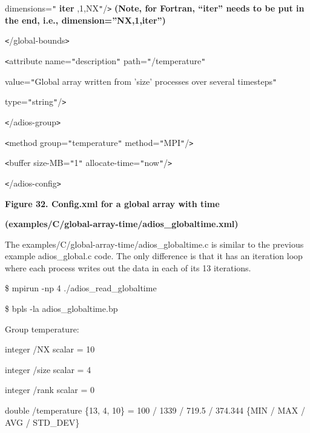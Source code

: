 {\color{color02} dimensions=\texttt{"}}{\color{color02} \textbf{iter}}{\color{color02} ,1,NX\texttt{"}/\texttt{>} 
   }{\color{color02} \textbf{(Note, for Fortran, ``iter'' needs to be put in the 
end, i.e., dimension=''NX,1,iter'')}}

\parindent=14pt
{\color{color02} \texttt{<}/global-bounds\texttt{>}}

\parindent=28pt
\texttt{<}attribute name=\texttt{"}description\texttt{"} path=\texttt{"}/temperature\texttt{"} 

\parindent=43pt
value=\texttt{"}Global array written from 'size' processes over several timesteps\texttt{"} 

type=\texttt{"}string\texttt{"}/\texttt{>}

\parindent=57pt
\texttt{<}/adios-group\texttt{>}

\parindent=0pt
\texttt{<}method group=\texttt{"}temperature\texttt{"} method=\texttt{"}MPI\texttt{"}/\texttt{>}

\texttt{<}buffer size-MB=\texttt{"}1\texttt{"} allocate-time=\texttt{"}now\texttt{"}/\texttt{>}

\texttt{<}/adios-config\texttt{>}

\label{HToc144350191}

\begin{center}
{\color{color20} \textbf{Figure 32. Config.xml for a global array with time}}

{\color{color20} \textbf{(examples/C/global-array-time/adios\_globaltime.xml)}}
\end{center}

\baselineskip=13pt
The examples/C/global-array-time/adios\_globaltime.c is similar to the previous 
example adios\_global.c code. The only difference is that it has an iteration loop 
where each process writes out the data in each of its 13 iterations.

\$ mpirun -np 4 ./adios\_read\_globaltime

\$ bpls -la adios\_globaltime.bp 

Group temperature:

\parindent=7pt
integer    /NX                       scalar = 10

integer    /size                     scalar = 4

\parindent=14pt
integer    /rank                     scalar = 0

\parindent=7pt
double     /temperature              \{13, 4, 10\} = 100 / 1339 / 719.5 / 374.344 
 \{MIN / MAX / AVG / STD\_DEV\}

